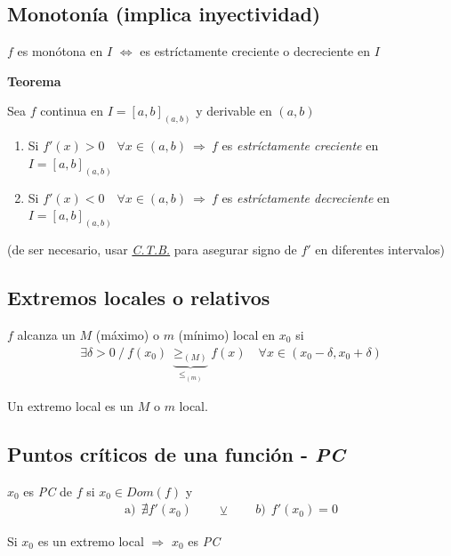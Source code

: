 \documentclass[11pt,titlepage]{article}
\newcommand{\littleTitle}[1]{
	\noindent \ignorespaces
	\small \textbf{#1} \normalsize
	\ignorespaces \ignorespacesafterend
}
\begin{document}
\subsection{Monotonía \footnotesize (implica inyectividad)}
\begin{center}
	$f$ es monótona en $I$ $\Leftrightarrow$ es estríctamente creciente o decreciente en $I$
\end{center} 
\littleTitle{Teorema} \par
Sea $f$ continua en $I = {[a,b]}_{(a,b)}$ y derivable en $(a,b)$
\begin{enumerate}[label=\alph*.]
	\item Si $f'(x) > 0 \quad \forall x \in (a,b) \ \Rightarrow \ f$ es \emph{estríctamente creciente} en $I = %
	{[a,b]}_{(a,b)}$
	\item Si $f'(x) < 0 \quad \forall x \in (a,b) \ \Rightarrow \ f$ es \emph{estríctamente decreciente} en $I = %
	{[a,b]}_{(a,b)}$
\end{enumerate} 
\begin{center}
	\footnotesize (de ser necesario, usar \hyperref[ctb]{\emph{C.T.B.}} para asegurar signo de $f'$ en diferentes intervalos)
\end{center}

\subsection{Extremos locales o relativos}
$f$ alcanza un $M$ (máximo) o $m$ (mínimo) local en $x_0$ si
\begin{gather*}
	\exists \delta > 0 \ / \ f(x_0) \ \underbrace{\geq_{\scriptscriptstyle(M)}}_{\leq_{\scriptscriptstyle(m)}} f(x) \quad \forall x \in (x_0 - \delta, x_0 + \delta)
\end{gather*} \par
Un extremo local es un $M$ o $m$ local.

\subsection{Puntos críticos de una función - \emph{PC}}
$x_0$ es \emph{PC} de $f$ si $x_0 \in Dom(f)$ y
\begin{gather*}
	\text{a)} \ \ \nexists f'(x_0) \qquad \veebar \qquad b) \ \ f'(x_0) = 0
\end{gather*} \par
\begin{center}
	Si $x_0$ es un extremo local $\Rightarrow$ $x_0$ es \emph{PC}
\end{center}
\end{document}
